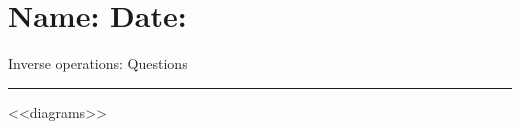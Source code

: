 \documentclass[12pt]{article}
\def \HeadingQuestions {\section*{\Large Name: \underline{\hspace{8cm}} \hfill Date: \underline{\hspace{3cm}}} \vspace{-3mm}
{Inverse operations: Questions} \vspace{1pt}\hrule}
\begin{document}
\HeadingQuestions
\vspace{8mm}
\begin{multicols}{2}
<<diagrams>>
\end{multicols}
\end{document}
